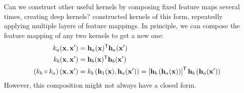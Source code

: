  
Can we construct other useful kernels by composing fixed feature maps several times, creating deep kernels?  \citet{cho2009kernel} constructed kernels of this form, repeatedly applying multiple layers of feature mappings.
In principle, we can compose the feature mapping of any two kernels to get a new one:
%
\begin{align}
k_a({\bf{x}}, {\bf{x}}') & = {\bf{h}}_a({\bf{x}}) ^{\mathsf{T}} {\bf{h}}_a({\bf{x}}') \\
k_b({\bf{x}}, {\bf{x}}') & = {\bf{h}}_b({\bf{x}}) ^{\mathsf{T}} {\bf{h}}_b({\bf{x}}') \\
\left( k_b \circ k_a \right)({\bf{x}}, {\bf{x}}') & = k_b \left({\bf{h}}_1({\bf{x}}), {\bf{h}}_a({\bf{x}}') \right) 
 = \left[ {\bf{h}}_b \left( {\bf{h}}_a({\bf{x}}) \right)\right] ^{\mathsf{T}} {\bf{h}}_b \left({\bf{h}}_a({\bf{x}}') \right) 
\end{align}
%
However, this composition might not always have a closed form.

